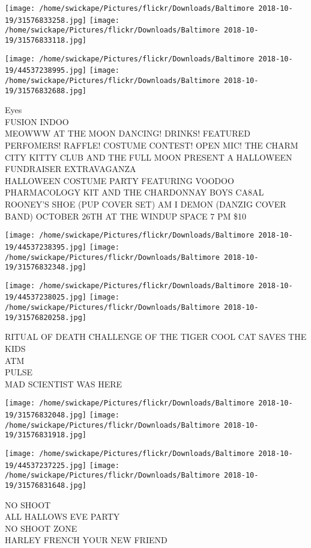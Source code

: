 \documentclass[10pt,letterpaper]{article}
\begin{document}
\texttt{[image: /home/swickape/Pictures/flickr/Downloads/Baltimore 2018-10-19/31576833258.jpg]}
\texttt{[image: /home/swickape/Pictures/flickr/Downloads/Baltimore 2018-10-19/31576833118.jpg]}

\texttt{[image: /home/swickape/Pictures/flickr/Downloads/Baltimore 2018-10-19/44537238995.jpg]}
\texttt{[image: /home/swickape/Pictures/flickr/Downloads/Baltimore 2018-10-19/31576832688.jpg]}

Eyes\\
FUSION INDOO\\
MEOWWW AT THE MOON DANCING!  DRINKS!  FEATURED PERFOMERS!  RAFFLE!  COSTUME CONTEST!  OPEN MIC!  THE CHARM CITY KITTY CLUB AND THE FULL MOON PRESENT A HALLOWEEN FUNDRAISER EXTRAVAGANZA\\
HALLOWEEN COSTUME PARTY FEATURING VOODOO PHARMACOLOGY KIT AND THE CHARDONNAY BOYS CA8AL ROONEY'S SHOE (PUP COVER SET) AM I DEMON (DANZIG COVER BAND) OCTOBER 26TH AT THE WINDUP SPACE 7 PM \$10\\
\pagebreak

\texttt{[image: /home/swickape/Pictures/flickr/Downloads/Baltimore 2018-10-19/44537238395.jpg]}
\texttt{[image: /home/swickape/Pictures/flickr/Downloads/Baltimore 2018-10-19/31576832348.jpg]}

\texttt{[image: /home/swickape/Pictures/flickr/Downloads/Baltimore 2018-10-19/44537238025.jpg]}
\texttt{[image: /home/swickape/Pictures/flickr/Downloads/Baltimore 2018-10-19/31576820258.jpg]}

RITUAL OF DEATH CHALLENGE OF THE TIGER COOL CAT SAVES THE KIDS\\
ATM\\
PULSE\\
MAD SCIENTIST WAS HERE\\
\pagebreak

\texttt{[image: /home/swickape/Pictures/flickr/Downloads/Baltimore 2018-10-19/31576832048.jpg]}
\texttt{[image: /home/swickape/Pictures/flickr/Downloads/Baltimore 2018-10-19/31576831918.jpg]}

\texttt{[image: /home/swickape/Pictures/flickr/Downloads/Baltimore 2018-10-19/44537237225.jpg]}
\texttt{[image: /home/swickape/Pictures/flickr/Downloads/Baltimore 2018-10-19/31576831648.jpg]}

NO SHOOT\\
ALL HALLOWS EVE PARTY\\
NO SHOOT ZONE\\
HARLEY FRENCH YOUR NEW FRIEND\\
\pagebreak
\end{document}
